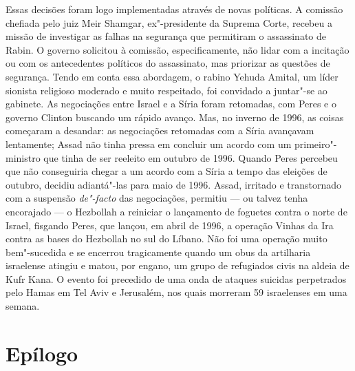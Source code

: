 Essas decisões foram logo implementadas através de novas políticas. A
comissão chefiada pelo juiz Meir Shamgar, ex"-presidente da Suprema
Corte, recebeu a missão de investigar as falhas na segurança que
permitiram o assassinato de Rabin. O governo solicitou à comissão,
especificamente, não lidar com a incitação ou com os antecedentes
políticos do assassinato, mas priorizar as questões de segurança.
Tendo em conta essa abordagem, o rabino Yehuda Amital, um líder sionista
religioso moderado e muito respeitado, foi convidado a juntar"-se ao
gabinete. As negociações entre Israel e a Síria foram retomadas, com
Peres e o governo Clinton buscando um rápido avanço. Mas, no inverno de
1996, as coisas começaram a desandar: as negociações retomadas com a
Síria avançavam lentamente; Assad não tinha pressa em concluir um acordo
com um primeiro"-ministro que tinha de ser reeleito em outubro de 1996.
Quando Peres percebeu que não conseguiria chegar a um acordo com a Síria
a tempo das eleições de outubro, decidiu adiantá"-las para maio de 1996.
Assad, irritado e transtornado com a suspensão \textit{de"-facto} das
negociações, permitiu --- ou talvez tenha encorajado --- o Hezbollah a
reiniciar o lançamento de foguetes contra o norte de Israel, fisgando
Peres, que lançou, em abril de 1996, a operação Vinhas da Ira contra
as bases do Hezbollah no sul do Líbano. Não foi uma operação muito bem"-sucedida
e se encerrou tragicamente quando um obus da artilharia
israelense atingiu e matou, por engano, um grupo de refugiados civis na
aldeia de Kufr Kana. O evento foi precedido de uma onda de ataques
suicidas perpetrados pelo Hamas em Tel Aviv e Jerusalém, nos quais
morreram 59 israelenses em uma semana.


\chapter*{Epílogo}

